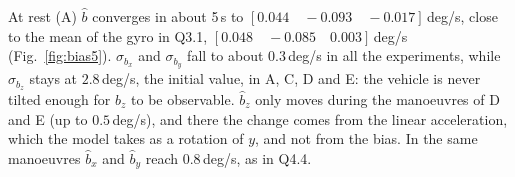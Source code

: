 \documentclass[10pt,a4paper]{article}
\newenvironment{answer}{%
  \begin{tcolorbox}[breakable,enhanced,colback=white,colframe=greyline,
    boxrule=0.6pt,arc=2pt,left=8pt,right=8pt,top=7pt,bottom=7pt,
    before skip=0pt,after skip=12pt]
}{\end{tcolorbox}}
\begin{document}
\begin{answer}
At rest (A) $\hat b$ converges in about 5\,s to
$[0.044 \quad -0.093 \quad -0.017]$\,deg/s, close to the mean of the
gyro in Q3.1, $[0.048 \quad -0.085 \quad 0.003]$\,deg/s
(Fig.~\ref{fig:bias5}). $\sigma_{b_x}$ and $\sigma_{b_y}$ fall to about
$0.3$\,deg/s in all the experiments, while $\sigma_{b_z}$ stays at
$2.8$\,deg/s, the initial value, in A, C, D and E: the vehicle is never
tilted enough for $b_z$ to be observable. $\hat b_z$ only moves during
the manoeuvres of D and E (up to $0.5$\,deg/s), and there the change
comes from the linear acceleration, which the model takes as a rotation
of $y$, and not from the bias. In the same manoeuvres $\hat b_x$ and
$\hat b_y$ reach $0.8$\,deg/s, as in Q4.4.
\end{answer}
\end{document}
